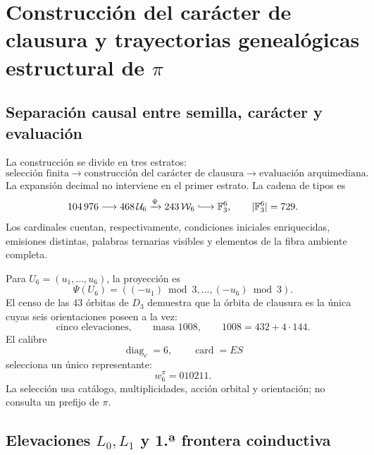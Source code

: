 \label{chap:83-08}


\section{Construcción del carácter de clausura y trayectorias genealógicas estructural de \(\pi\)}
\label{p12-83-c8-s1:chap:biografia-pi-autonoma}

\subsection{Separación causal entre semilla, carácter y evaluación}

La construcción se divide en tres estratos:
\[
 \text{selección finita}
 \longrightarrow
 \text{construcción del carácter de clausura}
 \longrightarrow
 \text{evaluación arquimediana}.
\]
La expansión decimal no interviene en el primer estrato. La cadena de tipos
es
\begin{equation}
 104\,976
 \longrightarrow468\,\mathcal U_6
 \xrightarrow{\Psi}243\,\mathcal W_6
 \lhook\joinrel\longrightarrow\mathbb F_3^6,
 \qquad|\mathbb F_3^6|=729.
 \label{p12-83-c8-s1:eq:cadena-tipica-pi-autonoma}
\end{equation}
Los cardinales cuentan, respectivamente, condiciones iniciales
enriquecidas, emisiones distintas, palabras ternarias visibles y elementos
de la fibra ambiente completa.

Para \(U_6=(u_1,\ldots,u_6)\), la proyección es
\[
 \Psi(U_6)=((-u_1)\bmod3,\ldots,(-u_6)\bmod3).
\]
El censo de las \(43\) órbitas de \(D_3\) demuestra que la órbita de
clausura es la única cuyas seis orientaciones poseen a la vez:
\[
 \text{cinco elevaciones},\qquad
 \text{masa }1008,\qquad
 1008=432+4\cdot144.
\]
El calibre
\[
 \operatorname{diag}_c=6,
 \qquad
 \operatorname{card}=ES
\]
selecciona un único representante:
\begin{equation}
 \boxed{w_6^\pi=010211.}
 \label{p12-83-c8-s1:eq:semilla-pi-autonoma}
\end{equation}
La selección usa catálogo, multiplicidades, acción orbital y orientación;
no consulta un prefijo de \(\pi\).

\subsection{Elevaciones \(L_0,L_1\) y 1.ª frontera coinductiva}

